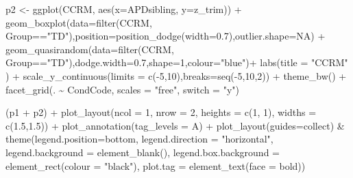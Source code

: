 \documentclass[a4paper, twoside]{templates/ociamthesis}
\newenvironment{Shaded}{\begin{snugshade}}{\end{snugshade}}
\newcommand{\AttributeTok}[1]{\textcolor[rgb]{0.77,0.63,0.00}{#1}}
\newcommand{\ConstantTok}[1]{\textcolor[rgb]{0.00,0.00,0.00}{#1}}
\newcommand{\DecValTok}[1]{\textcolor[rgb]{0.00,0.00,0.81}{#1}}
\newcommand{\FloatTok}[1]{\textcolor[rgb]{0.00,0.00,0.81}{#1}}
\newcommand{\FunctionTok}[1]{\textcolor[rgb]{0.00,0.00,0.00}{#1}}
\newcommand{\NormalTok}[1]{#1}
\newcommand{\OtherTok}[1]{\textcolor[rgb]{0.56,0.35,0.01}{#1}}
\newcommand{\SpecialCharTok}[1]{\textcolor[rgb]{0.00,0.00,0.00}{#1}}
\newcommand{\StringTok}[1]{\textcolor[rgb]{0.31,0.60,0.02}{#1}}
\renewenvironment{Shaded}
{
  \vspace{4pt}%
  \begin{snugshade}%
}{%
  \end{snugshade}%
  \vspace{4pt}%
}
\begin{document}
\begin{Shaded}
\begin{Highlighting}[]
\NormalTok{p2 }\OtherTok{\textless{}{-}} \FunctionTok{ggplot}\NormalTok{(CCRM, }\FunctionTok{aes}\NormalTok{(}\AttributeTok{x=}\NormalTok{APDsibling, }\AttributeTok{y=}\NormalTok{z\_trim)) }\SpecialCharTok{+}
  \FunctionTok{geom\_boxplot}\NormalTok{(}\AttributeTok{data=}\FunctionTok{filter}\NormalTok{(CCRM, Group}\SpecialCharTok{==}\StringTok{"TD"}\NormalTok{),}\AttributeTok{position=}\FunctionTok{position\_dodge}\NormalTok{(}\AttributeTok{width=}\FloatTok{0.7}\NormalTok{),}\AttributeTok{outlier.shape=}\ConstantTok{NA}\NormalTok{) }\SpecialCharTok{+}
  \FunctionTok{geom\_quasirandom}\NormalTok{(}\AttributeTok{data=}\FunctionTok{filter}\NormalTok{(CCRM, Group}\SpecialCharTok{==}\StringTok{"TD"}\NormalTok{),}\AttributeTok{dodge.width=}\FloatTok{0.7}\NormalTok{,}\AttributeTok{shape=}\DecValTok{1}\NormalTok{,}\AttributeTok{colour=}\StringTok{"blue"}\NormalTok{)}\SpecialCharTok{+}
  \FunctionTok{labs}\NormalTok{(}\AttributeTok{title =} \StringTok{"CCRM"}\NormalTok{ ) }\SpecialCharTok{+} 
  \FunctionTok{scale\_y\_continuous}\NormalTok{(}\AttributeTok{limits =} \FunctionTok{c}\NormalTok{(}\SpecialCharTok{{-}}\DecValTok{5}\NormalTok{,}\DecValTok{10}\NormalTok{),}\AttributeTok{breaks=}\FunctionTok{seq}\NormalTok{(}\SpecialCharTok{{-}}\DecValTok{5}\NormalTok{,}\DecValTok{10}\NormalTok{,}\DecValTok{2}\NormalTok{)) }\SpecialCharTok{+}
  \FunctionTok{theme\_bw}\NormalTok{() }\SpecialCharTok{+}
  \FunctionTok{facet\_grid}\NormalTok{(. }\SpecialCharTok{\textasciitilde{}}\NormalTok{ CondCode, }\AttributeTok{scales =} \StringTok{"free"}\NormalTok{, }\AttributeTok{switch =} \StringTok{"y"}\NormalTok{)}

\NormalTok{(p1 }\SpecialCharTok{+}\NormalTok{ p2) }\SpecialCharTok{+} \FunctionTok{plot\_layout}\NormalTok{(}\AttributeTok{ncol =} \DecValTok{1}\NormalTok{, }\AttributeTok{nrow =} \DecValTok{2}\NormalTok{, }\AttributeTok{heights =} \FunctionTok{c}\NormalTok{(}\DecValTok{1}\NormalTok{, }\DecValTok{1}\NormalTok{), }\AttributeTok{widths =} \FunctionTok{c}\NormalTok{(}\FloatTok{1.5}\NormalTok{,}\FloatTok{1.5}\NormalTok{)) }\SpecialCharTok{+} \FunctionTok{plot\_annotation}\NormalTok{(}\AttributeTok{tag\_levels =} \StringTok{\textquotesingle{}A\textquotesingle{}}\NormalTok{) }\SpecialCharTok{+} \FunctionTok{plot\_layout}\NormalTok{(}\AttributeTok{guides=}\StringTok{\textquotesingle{}collect\textquotesingle{}}\NormalTok{) }\SpecialCharTok{\&}
  \FunctionTok{theme}\NormalTok{(}\AttributeTok{legend.position=}\StringTok{\textquotesingle{}bottom\textquotesingle{}}\NormalTok{,        }
        \AttributeTok{legend.direction =} \StringTok{"horizontal"}\NormalTok{,}
        \AttributeTok{legend.background =} \FunctionTok{element\_blank}\NormalTok{(),}
        \AttributeTok{legend.box.background =} \FunctionTok{element\_rect}\NormalTok{(}\AttributeTok{colour =} \StringTok{"black"}\NormalTok{),}
        \AttributeTok{plot.tag =} \FunctionTok{element\_text}\NormalTok{(}\AttributeTok{face =} \StringTok{\textquotesingle{}bold\textquotesingle{}}\NormalTok{))}
\end{Highlighting}
\end{Shaded}
\end{document}
